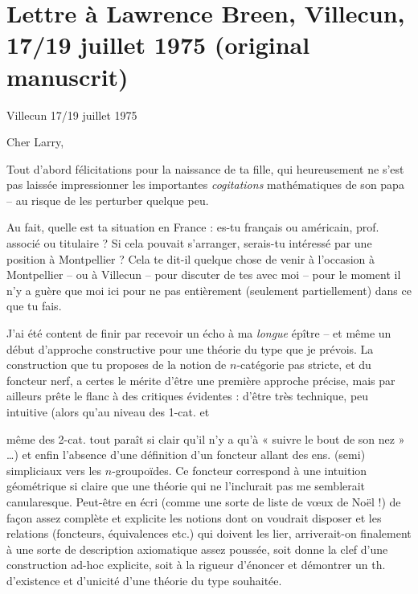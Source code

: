 \documentclass[11pt,a4paper]{article}
\begin{document}
\section{Lettre à Lawrence Breen, Villecun, 17/19 juillet 1975 (original manuscrit)}

Villecun 17/19 juillet 1975

Cher Larry,

Tout d'abord félicitations pour la naissance de ta fille, qui heureusement ne s'est pas laissée impressionner  les importantes \emph{cogitations} mathématiques de son papa -- au risque de les perturber quelque peu.

Au fait, quelle est ta situation en France : es-tu français ou américain, prof. associé ou titulaire ? Si cela pouvait s'arranger, serais-tu intéressé par une position à Montpellier ? Cela te dit-il quelque chose de venir à l'occasion à Montpellier -- ou à Villecun -- pour discuter de tes  avec moi -- pour le moment il n'y a guère que moi ici pour ne pas  entièrement (seulement partiellement) dans ce que tu fais.

J'ai été content de finir par recevoir un écho à ma \emph{longue} épître -- et même un début d'approche constructive pour \struck{\ill{}} une théorie du type que je prévois. La construction que tu proposes de la notion de $n$-catégorie pas stricte, et du foncteur nerf, a certes le mérite  d'être une première approche précise, mais par ailleurs prête \struck{\ill{}}  le flanc à des critiques évidentes : d'être très technique, peu intuitive (alors qu'au niveau des 1-cat. et

même des 2-cat. tout paraît si clair qu'il n'y a qu'à « suivre le bout de son nez » …) et enfin l'absence d'une définition d'un foncteur allant des ens. (semi) simpliciaux vers les $n$-groupoïdes. Ce foncteur correspond à une intuition géométrique si claire que une théorie qui ne l'inclurait pas me semblerait canularesque. Peut-être en écri (comme une sorte de liste de vœux de Noël !) de façon assez complète et explicite les  notions dont on voudrait disposer et les relations (foncteurs, équivalences etc.) qui doivent les lier, arriverait-on finalement à une sorte de description axiomatique assez poussée,  soit donne la clef d'une construction ad-hoc explicite, soit  à la rigueur d'énoncer et démontrer un th. d'existence et d'unicité d'une théorie du type souhaitée.
\end{document}

